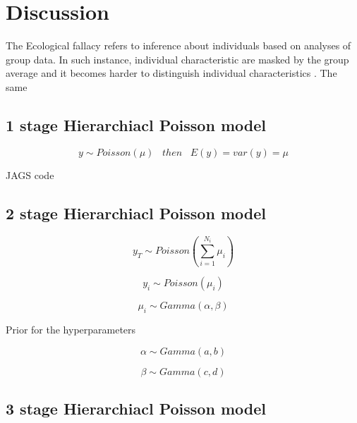 \chapter{Discussion}





The Ecological fallacy refers to inference about individuals based on analyses of group data. In such instance, individual characteristic are masked by the group average and it becomes harder to distinguish individual characteristics \citep{herring2001culture}. The same 






\section{1 stage Hierarchiacl Poisson model}

	\begin{equation}\nonumber
	y \sim Poisson(\mu) \;\;\; then \;\;\; E(y) = var(y) =\mu
	\end{equation}
	
	JAGS code




\section{2 stage Hierarchiacl Poisson model}

	\begin{equation}\nonumber
	y_T \sim Poisson(\sum_{i=1}^{N_i} \mu_i) 
	\end{equation}

	\begin{equation}\nonumber
	y_i \sim Poisson(\mu_i) 
	\end{equation}

	\begin{equation}\nonumber
	\mu_i \sim Gamma(\alpha,\beta) 
	\end{equation}

	Prior for the hyperparameters

	\begin{equation}\nonumber
	\alpha \sim Gamma(a,b) 
	\end{equation}

	\begin{equation}\nonumber
	\beta \sim Gamma(c,d) 
	\end{equation}
	
\section{3 stage Hierarchiacl Poisson model}

